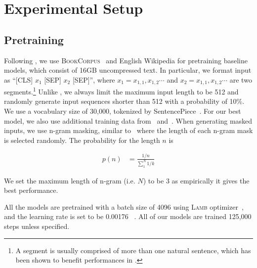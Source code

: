 





\section{Experimental Setup}

\subsection{Pretraining}

Following \bert\citep{devlin2018bert}, we use \textsc{BookCorpus}~\citep{zhu2015aligning} and English Wikipedia for pretraining baseline models, which consist of 16GB uncompressed text. In particular, we format input as ``\textsc{[CLS]} $x_1$ \textsc{[SEP]} $x_2$ \textsc{[SEP]}'', where $x_1=x_{1,1},x_{1,2}\cdots$ and $x_2=x_{1,1},x_{1,2}\cdots$ are two segments.\footnote{A segment is usually comprised of more than one natural sentence, which has been shown to benefit performances in \cite{liu2019roberta}.} Unlike \bert, we always limit the maximum input length to be 512 and randomly generate input sequences shorter than 512 with a probability of 10\%. We use a vocabulary size of 30,000, tokenized by SentencePiece~\citep{kudo-richardson-2018-sentencepiece}. For our best model, we also use additional training data from~\cite{liu2019roberta} and~\cite{yang2019xlnet}. When generating masked inputs, we use n-gram masking, similar to~\cite{joshi2019spanbert} where the length of each n-gram mask is selected randomly. The probability for the length $n$ is


\begin{align}
    p(n) &= \frac{1/n}{\sum_1^N{1/k}}
\end{align}

We set the maximum length of n-gram (i.e. $N$) to be 3 as empirically it gives the best performance.

All the models are pretrained with a batch size of 4096 using \textsc{Lamb} optimizer~\citep{you2019reducing}, and the learning rate is set to be 0.00176 ~\citep{you2019reducing}. All of our models are trained 125,000 steps unless specified. 


